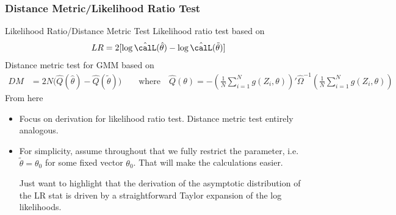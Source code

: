 \documentclass[aspectratio=169, handout]{beamer}
\newcommand{\sumiN}{\sum^N_{i=1}}
\begin{document}
\subsubsection{Distance Metric/Likelihood Ratio Test}

{\footnotesize
\begin{frame}{Likelihood Ratio/Distance Metric Test}
Likelihood ratio test based on
\begin{align*}
  LR
  =
  2[
    \log \hat{\calL}(\hat{\theta})
    -\log \hat{\calL}(\tilde{\theta})
  ]
\end{align*}
Distance metric test for GMM based on
\begin{align*}
  DM
  &=
  2N\big(
  \hat{Q}(\hat{\theta})
  -\hat{Q}(\tilde{\theta})
  \big)
  \qquad\text{where}\quad
  \hat{Q}(\theta)
  =
  -\left(
  \frac{1}{N}
  \sumiN
  g(Z_i,\theta)
  \right)'
  \hat{\Omega}^{-1}
  \left(
  \frac{1}{N}
  \sumiN
  g(Z_i,\theta)
  \right)
\end{align*}
From here
\begin{itemize}
  \item Focus on derivation for likelihood ratio test.
    Distance metric test entirely analogous.
  \item
    For simplicity, assume throughout that we fully restrict the
    parameter, i.e. $\tilde{\theta}=\theta_0$ for some fixed vector
    $\theta_0$.
    That will make the calculations easier.

    Just want to highlight that the derivation of the asymptotic
    distribution of the LR stat is driven by a straightforward Taylor
    expansion of the log likelihoods.
\end{itemize}
\end{frame}
}
\end{document}
